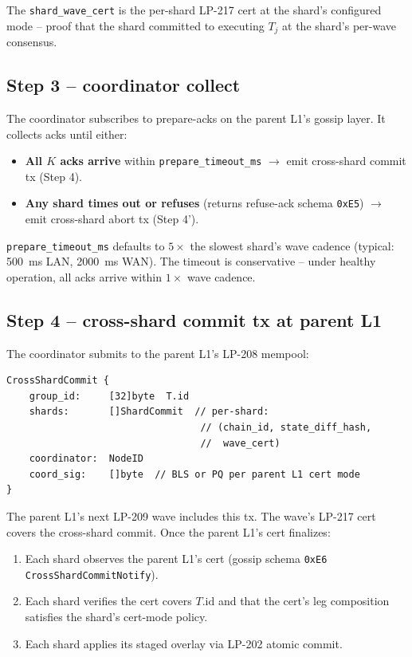 The \texttt{shard\_wave\_cert} is the per-shard LP-217 cert at the
shard's configured mode -- proof that the shard committed to
executing $T_j$ at the shard's per-wave consensus.

\subsection{Step 3 -- coordinator collect}

The coordinator subscribes to prepare-acks on the parent L1's gossip
layer. It collects acks until either:

\begin{itemize}[leftmargin=2em,nosep]
\item \textbf{All $K$ acks arrive} within
  \texttt{prepare\_timeout\_ms} $\to$ emit cross-shard commit tx
  (Step 4).
\item \textbf{Any shard times out or refuses} (returns refuse-ack
  schema \texttt{0xE5}) $\to$ emit cross-shard abort tx (Step 4').
\end{itemize}

\texttt{prepare\_timeout\_ms} defaults to $5\times$ the slowest
shard's wave cadence (typical: \SI{500}{\milli\second} LAN,
\SI{2000}{\milli\second} WAN). The timeout is conservative -- under
healthy operation, all acks arrive within $1\times$ wave cadence.

\subsection{Step 4 -- cross-shard commit tx at parent L1}

The coordinator submits to the parent L1's LP-208 mempool:

\begin{verbatim}
CrossShardCommit {
    group_id:     [32]byte  T.id
    shards:       []ShardCommit  // per-shard:
                                  // (chain_id, state_diff_hash,
                                  //  wave_cert)
    coordinator:  NodeID
    coord_sig:    []byte  // BLS or PQ per parent L1 cert mode
}
\end{verbatim}

The parent L1's next LP-209 wave includes this tx. The wave's
LP-217 cert covers the cross-shard commit. Once the parent L1's
cert finalizes:

\begin{enumerate}[leftmargin=2em,nosep]
\item Each shard observes the parent L1's cert (gossip schema
  \texttt{0xE6} \texttt{CrossShardCommitNotify}).
\item Each shard verifies the cert covers $T.\textrm{id}$ and that
  the cert's leg composition satisfies the shard's cert-mode
  policy.
\item Each shard applies its staged overlay via LP-202 atomic
  commit.
\end{enumerate}

